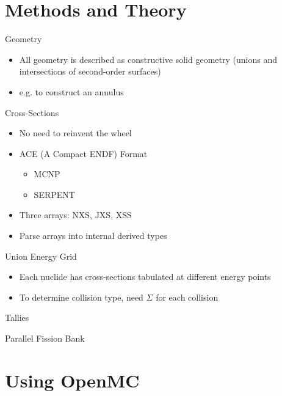 \documentclass{beamer}
\begin{document}
\section{Methods and Theory}

\begin{frame}{Geometry}
  \begin{itemize}
  \item All geometry is described as constructive solid geometry (unions and
    intersections of second-order surfaces)
  \item e.g. to construct an annulus
  \end{itemize}
\end{frame}

\begin{frame}{Cross-Sections}
  \begin{itemize}
  \item No need to reinvent the wheel
  \item ACE (A Compact ENDF) Format
    \begin{itemize}
    \item MCNP
    \item SERPENT
    \end{itemize}
  \item Three arrays: NXS, JXS, XSS
  \item Parse arrays into internal derived types
  \end{itemize}
\end{frame}

\begin{frame}{Union Energy Grid}
  \begin{itemize}
  \item Each nuclide has cross-sections tabulated at different energy points
  \item To determine collision type, need $\Sigma$ for each collision
  \end{itemize}
\end{frame}

\begin{frame}{Tallies}
\end{frame}

\begin{frame}{Parallel Fission Bank}
\end{frame}

\section{Using OpenMC}
\end{document}
